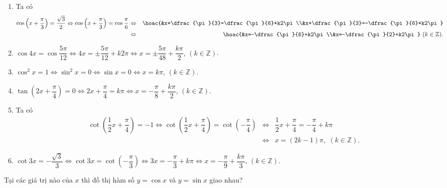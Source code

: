 \begin{bt}
{\begin{enumerate}
\begin{eqnarray*}
			\end{eqnarray*}
			\item Ta có
			\allowdisplaybreaks
			\begin{eqnarray*}
				\cos \left(x+\dfrac{\pi}{3}\right) = \dfrac{\sqrt{3}}{2} \Leftrightarrow \cos\left(x+\dfrac{\pi}{3}\right)=\cos\dfrac{\pi}{6} &\Leftrightarrow& \hoac{&x+\dfrac{\pi}{3}=\dfrac{\pi}{6}+k2\pi\\&x+\dfrac{\pi}{3}=-\dfrac{\pi}{6}+k2\pi}\\
				&\Leftrightarrow& \hoac{&x=-\dfrac{\pi}{6}+k2\pi\\&x=-\dfrac{\pi}{2}+k2\pi}\,\,(k\in\mathbb{Z}).
			\end{eqnarray*}
			\item $\cos 4 x=\cos \dfrac{5 \pi}{12}\Leftrightarrow4x=\pm\dfrac{5\pi}{12}+k2\pi\Leftrightarrow x=\pm\dfrac{5\pi}{48}+\dfrac{k\pi}{2},\,(k\in\mathbb{Z})$.
			\item $\cos^2x=1\Leftrightarrow\sin^2x=0\Leftrightarrow\sin x=0\Leftrightarrow x=k\pi,\,(k\in\mathbb{Z})$.
			\item $\tan \left(2 x+\dfrac{\pi}{4}\right)=0\Leftrightarrow2x+\dfrac{\pi}{4}=k\pi\Leftrightarrow x=-\dfrac{\pi}{8}+\dfrac{k\pi}{2},\,(k\in\mathbb{Z})$.
			\item Ta có
			\allowdisplaybreaks
			\begin{eqnarray*}
				\cot \left(\dfrac{1}{2} x+\dfrac{\pi}{4}\right)=-1 \Leftrightarrow \cot\left(\dfrac{1}{2}x+\dfrac{\pi}{4}\right)=\cot\left(-\dfrac{\pi}{4}\right) &\Leftrightarrow& \dfrac{1}{2}x+\dfrac{\pi}{4}=-\dfrac{\pi}{4}+k\pi\\
				&\Leftrightarrow& x=(2k-1)\pi,\,\,(k\in\mathbb{Z}).
			\end{eqnarray*}
			\item $\cot3x=-\dfrac{\sqrt{3}}{3}\Leftrightarrow\cot3x=\cot\left(-\dfrac{\pi}{3}\right)\Leftrightarrow3x=-\dfrac{\pi}{3}+k\pi\Leftrightarrow x=-\dfrac{\pi}{9}+\dfrac{k\pi}{3},\,(k\in\mathbb{Z})$.
		\end{enumerate}
	}
\end{bt}

\begin{bt}%
	Tại các giá trị nào của $x$ thì đồ thị hàm số $y=\cos x$ và $y=\sin x$ giao nhau?
\end{bt}

